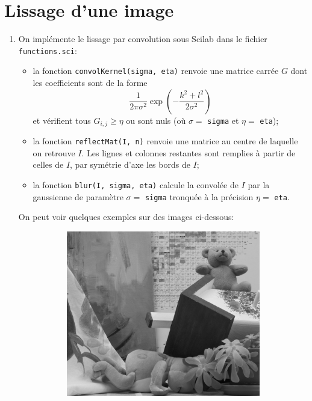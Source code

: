 \section{Lissage d'une image}

\begin{enumerate}[questions, start=11]
\item On implémente le lissage par convolution sous Scilab dans le fichier \verb|functions.sci|:
  \begin{itemize}
  \item la fonction \verb|convolKernel(sigma, eta)| renvoie une matrice carrée $G$ dont les coefficients sont de la forme 
  \[ \dfrac{1}{2\pi\sigma^2}\exp{\left( -\dfrac{k^2 + l^2}{2\sigma^2} \right)} \]
  et vérifient tous $G_{i,j} \geq \eta$ ou sont nuls (où $\sigma =$ \verb|sigma| et $\eta = $ \verb|eta|);
  \item la fonction \verb|reflectMat(I, n)| renvoie une matrice au centre de laquelle on retrouve $I$. Les lignes et colonnes restantes sont remplies à partir de celles de $I$, par \og{}symétrie d'axe les bords de $I$\fg{};
  \item la fonction \verb|blur(I, sigma, eta)| calcule la convolée de $I$ par la gaussienne de paramètre $\sigma = $ \verb|sigma| tronquée à la précision $\eta = $ \verb|eta|.
  \end{itemize}
On peut voir quelques exemples sur des images ci-dessous:
\begin{figure}[!h]
\centering
  \begin{subfigure}{0.3\textwidth}
  \includegraphics[width=\textwidth]{img/teddy-noblur.png}

\end{subfigure}
\end{figure}
\end{enumerate}
